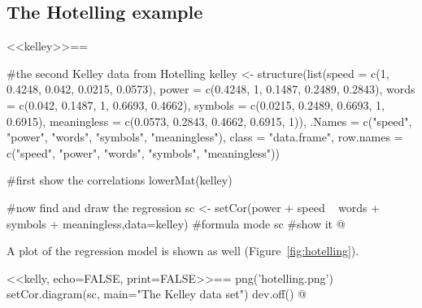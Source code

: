 \documentclass[11pt]{article}
\newcommand{\pfun}[1]{{\texttt{#1}\index{#1}\index{R function!#1}\index{R function!psych package!#1}}}\newcommand{\Rc}[1]{{\texttt{#1}}}    %
\begin{document}
\subsection{The Hotelling example} 
<<kelley>>==

#the second Kelley data from Hotelling
kelley <- structure(list(speed = c(1, 0.4248, 0.042, 0.0215, 0.0573), power = c(0.4248, 
1, 0.1487, 0.2489, 0.2843), words = c(0.042, 0.1487, 1, 0.6693, 
0.4662), symbols = c(0.0215, 0.2489, 0.6693, 1, 0.6915), meaningless = c(0.0573, 
0.2843, 0.4662, 0.6915, 1)), .Names = c("speed", "power", "words", 
"symbols", "meaningless"), class = "data.frame", row.names = c("speed", 
"power", "words", "symbols", "meaningless"))

#first show the correlations
lowerMat(kelley)

#now find and draw the regression
sc <- setCor(power + speed ~ words + symbols + meaningless,data=kelley)  #formula mode
sc  #show it
@


%
%
%
%
%
%
%
%
%
%
%

A plot of the regression model is shown as well (Figure~\ref{fig:hotelling}).


<<kelly, echo=FALSE, print=FALSE>>==
png('hotelling.png')
setCor.diagram(sc, main="The  Kelley data set")
dev.off()
@
\end{document}
